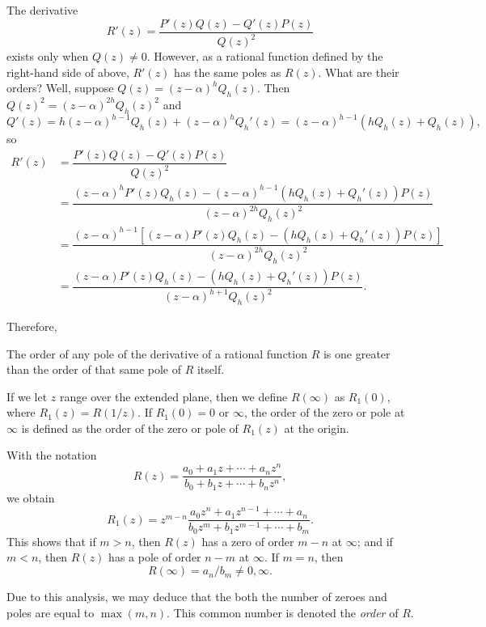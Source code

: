 The derivative $$R'(z)=\dfrac{P'(z)Q(z)-Q'(z)P(z)}{Q(z)^2}$$ exists only when $Q(z) \neq 0$. However, as a rational function defined by the right-hand side of above, $R'(z)$ has the same poles as $R(z)$. What are their orders? Well, suppose $Q(z)=(z-\alpha)^hQ_h(z)$. Then $Q(z)^2=(z-\alpha)^{2h}Q_h(z)^2$ and $$Q'(z)=h(z-\alpha)^{h-1}Q_h(z)+(z-\alpha)^hQ_h'(z)=(z-\alpha)^{h-1}(hQ_h(z)+Q_h(z)),$$ so
\begin{align*}
	R'(z) &=\dfrac{P'(z)Q(z)-Q'(z)P(z)}{Q(z)^2} \\
	&=\dfrac{(z-\alpha)^hP'(z)Q_h(z)-(z-\alpha)^{h-1}(hQ_h(z)+Q_h'(z))P(z)}{(z-\alpha)^{2h}Q_h(z)^2} \\
	&=\dfrac{(z-\alpha)^{h-1}\left[(z-\alpha)P'(z)Q_h(z)-(hQ_h(z)+Q_h'(z))P(z)\right]}{(z-\alpha)^{2h}Q_h(z)^2} \\
	&=\dfrac{(z-\alpha)P'(z)Q_h(z)-(hQ_h(z)+Q_h'(z))P(z)}{(z-\alpha)^{h+1}Q_h(z)^2}.
\end{align*}

Therefore,
\begin{proposition}
	The order of any pole of the derivative of a rational function $R$ is one greater than the order of that same pole of $R$ itself.
\end{proposition}

If we let $z$ range over the extended plane, then we define $R(\infty)$ as $R_1(0)$, where $R_1(z)=R(1/z)$. If $R_1(0)=0$ or $\infty$, the order of the zero or pole at $\infty$ is defined as the order of the zero or pole of $R_1(z)$ at the origin.

With the notation $$R(z)=\dfrac{a_0+a_1z+\cdots+a_nz^n}{b_0+b_1z+\cdots+b_nz^n},$$ we obtain $$R_1(z)=z^{m-n}\dfrac{a_0z^n+a_1z^{n-1}+\cdots+a_n}{b_0z^m+b_1z^{m-1}+\cdots+b_m}.$$ This shows that if $m>n$, then $R(z)$ has a zero of order $m-n$ at $\infty$; and if $m<n$, then $R(z)$ has a pole of order $n-m$ at $\infty$. If $m=n$, then $$R(\infty)=a_n/b_m \neq 0,\infty.$$

Due to this analysis, we may deduce that the both the number of zeroes and poles are equal to $\max(m,n)$. This common number is denoted the \emph{order} of $R$.

